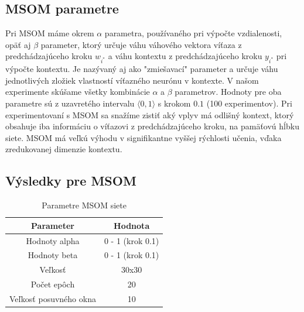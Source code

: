 \subsection{MSOM parametre}
Pri MSOM máme okrem $\alpha$ parametra, používaného pri výpočte vzdialenosti, opäť aj $\beta$ parameter, ktorý určuje váhu
váhového vektora víťaza z predchádzajúceho kroku $w_{i^{*}}$ a váhu kontextu
z predchádzajúceho kroku $y_{i^{*}}$ pri výpočte kontextu. Je nazývaný aj ako "zmiešavací" parameter
a určuje váhu jednotlivých zložiek vlastností víťazného neurónu v kontexte.
V našom experimente skúšame všetky kombinácie $\alpha$ a $\beta$ parametrov.
Hodnoty pre oba parametre sú z uzavretého intervalu $\langle 0, 1\rangle$ s krokom $0.1$ (100 experimentov).
Pri experimentovaní s MSOM sa snažíme zistiť aký vplyv má odlišný kontext, ktorý obsahuje iba informáciu
o víťazovi z predchádzajúceho kroku, na pamäťovú hĺbku siete. MSOM má veľkú výhodu v signifikantne 
vyššej rýchlosti učenia, vďaka zredukovanej dimenzie kontextu.

\subsection{Výsledky pre MSOM}

\begin{table}[h!]
    \centering
    \begin{tabular}{|c|c|} 
     \hline
     Parameter & Hodnota \\ 
     \hline\hline
     Hodnoty alpha & 0 - 1 (krok 0.1)  \\ 
     \hline
     Hodnoty beta & 0 - 1  (krok 0.1) \\ 
     \hline
     Veľkosť & 30x30  \\
     \hline
     Počet epôch & 20  \\
     \hline
     Veľkosť posuvného okna & 10  \\
     \hline
    \end{tabular}
    \caption{Parametre MSOM siete}
    \label{table:1}
    \end{table}
    
